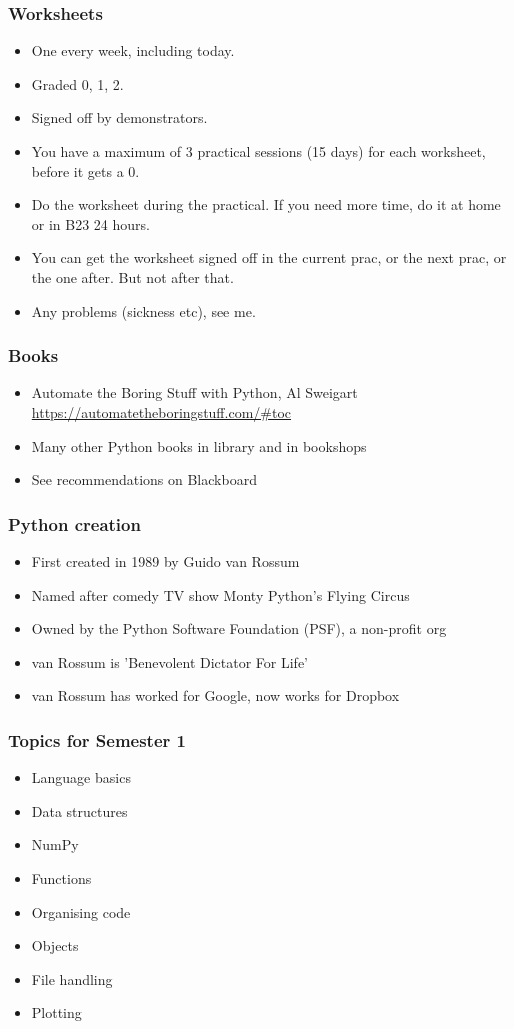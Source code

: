 \documentclass{beamer}
\begin{document}
\begin{frame}
\frametitle{Worksheets}
\begin{itemize}
\item One every week, including today.
\item Graded 0, 1, 2.
\item Signed off by demonstrators.
\item You have a maximum of 3 practical sessions (15 days) for each
  worksheet, before it gets a 0.
\item Do the worksheet during the practical. If you need more time, do
  it at home or in B23 24 hours. 
\item You can get the worksheet signed off in the current prac, or the
  next prac, or the one after. But not after that.
\item Any problems (sickness etc), see me.
\end{itemize}
\end{frame}


\begin{frame}
\frametitle{Books}
\begin{itemize}
\item Automate the Boring Stuff with Python, Al Sweigart 
    \url{https://automatetheboringstuff.com/\#toc}
\item Many other Python books in library and in bookshops
\item See recommendations on Blackboard
\end{itemize}
\end{frame}

\begin{frame}
\frametitle{Python creation}
\begin{itemize}
\item First created in 1989 by Guido van Rossum
\item Named after comedy TV show Monty Python's Flying Circus
\item Owned by the Python Software Foundation (PSF), a non-profit org
\item van Rossum is 'Benevolent Dictator For Life'
\item van Rossum has worked for Google, now works for Dropbox
\end{itemize}
\end{frame}



\begin{frame}
\frametitle{Topics for Semester 1}
\begin{itemize}
\item Language basics
\item Data structures
\item NumPy
\item Functions
\item Organising code
\item Objects
\item File handling
\item Plotting
\end{itemize}
\end{frame}
\end{document}

